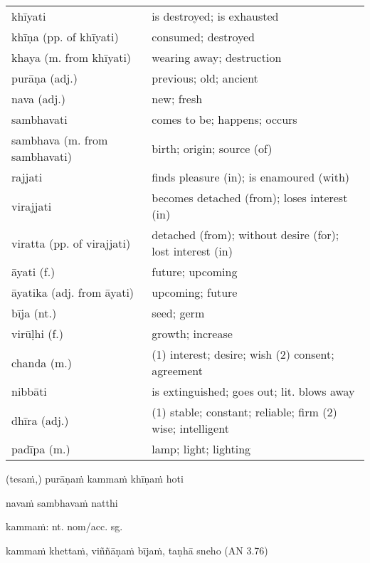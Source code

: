 \documentclass[11pt,oneside]{memoir}
\begin{document}
\begin{longtable}{L{\colOne} L{\colTwo}}
khīyati & is destroyed; is exhausted\\[0pt]
khīṇa (pp. of khīyati) & consumed; destroyed\\[0pt]
khaya (m. from khīyati) & wearing away; destruction\\[0pt]
purāṇa (adj.) & previous; old; ancient\\[0pt]
nava (adj.) & new; fresh\\[0pt]
sambhavati & comes to be; happens; occurs\\[0pt]
sambhava (m. from sambhavati) & birth; origin; source (of)\\[0pt]
rajjati & finds pleasure (in); is enamoured (with)\\[0pt]
virajjati & becomes detached (from); loses interest (in)\\[0pt]
viratta (pp. of virajjati) & detached (from); without desire (for); lost interest (in)\\[0pt]
āyati (f.) & future; upcoming\\[0pt]
āyatika (adj. from āyati) & upcoming; future\\[0pt]
bīja (nt.) & seed; germ\\[0pt]
virūḷhi (f.) & growth; increase\\[0pt]
chanda (m.) & (1) interest; desire; wish (2) consent; agreement\\[0pt]
nibbāti & is extinguished; goes out; lit. blows away\\[0pt]
dhīra (adj.) & (1) stable; constant; reliable; firm (2) wise; intelligent\\[0pt]
padīpa (m.) & lamp; light; lighting\\[0pt]
\end{longtable}

(tesaṁ,) purāṇaṁ kammaṁ khīṇaṁ hoti

navaṁ sambhavaṁ natthi

kammaṁ: nt. nom/acc. sg.

kammaṁ khettaṁ, viññāṇaṁ bījaṁ, taṇhā sneho (AN 3.76)
\end{document}
